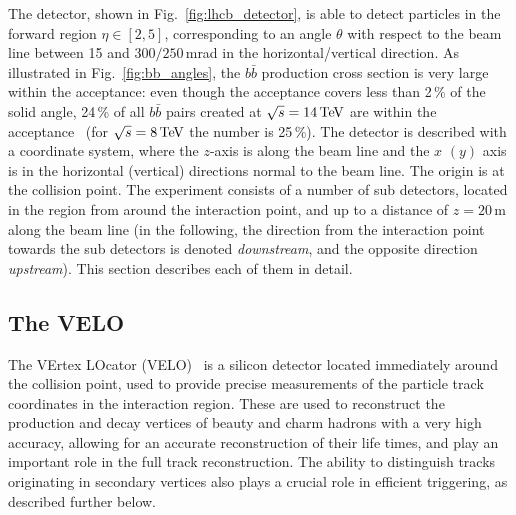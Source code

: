 The \lhcb detector, shown in Fig.~\ref{fig:lhcb_detector},  is able to detect particles in the forward region $\eta\in[2, 5]$, corresponding to an angle $\theta$ with respect to the beam line between 15 and $300/250$\,mrad in the horizontal/vertical direction. As illustrated in Fig.~\ref{fig:bb_angles}, the $b\bar b$ production cross section is very large within the \lhcb acceptance: even though the acceptance covers less than 2\,\% of the solid angle,  24\,\% of all $b\bar b$ pairs created at $\sqrt{s}=14\text{\,Te\kern -0.1em V}$ are within the acceptance~\cite{bbangles} (for $\sqrt{s}=8\text{\,Te\kern -0.1em V}$ the number is 25\,\%). The detector is described with a coordinate system, where the $z$-axis is along the beam line and the $x$ $(y)$ axis is in the horizontal (vertical) directions normal to the beam line. The origin is at the collision point. The experiment consists of a number of sub detectors, located in the region from around the interaction point, and up to a distance of $z=20\,$m along the beam line (in the following, the direction from the interaction point towards the sub detectors is denoted \emph{downstream}, and the opposite direction \emph{upstream}). This section describes each of them in detail.
 
\subsection{The VELO} %
\label{sub:the_velo}
The VErtex LOcator (VELO)~\cite{VELO-TDR} is a silicon detector located immediately around the collision point, used to provide precise measurements of the particle track coordinates in the interaction region. These are used to reconstruct the production and decay vertices of beauty and charm hadrons with a very high accuracy, allowing for an accurate reconstruction of their life times, and play an important role in the full track reconstruction. The ability to distinguish tracks originating in secondary vertices also plays a crucial role in efficient triggering, as described further below.

